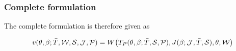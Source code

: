 \subsubsection{Complete formulation}

The complete formulation is therefore given as

\begin{equation}
    v(\theta,\beta;\bar{T},\mathcal{W},\mathcal{S},\mathcal{J},\mathcal{P}) = W\big(T_{P}(\theta,\beta; \bar{T},\mathcal{S},\mathcal{P}), J(\beta; \mathcal{J}, \bar{T}, \mathcal{S}), \theta, \mathcal{W}\big)
\end{equation}





